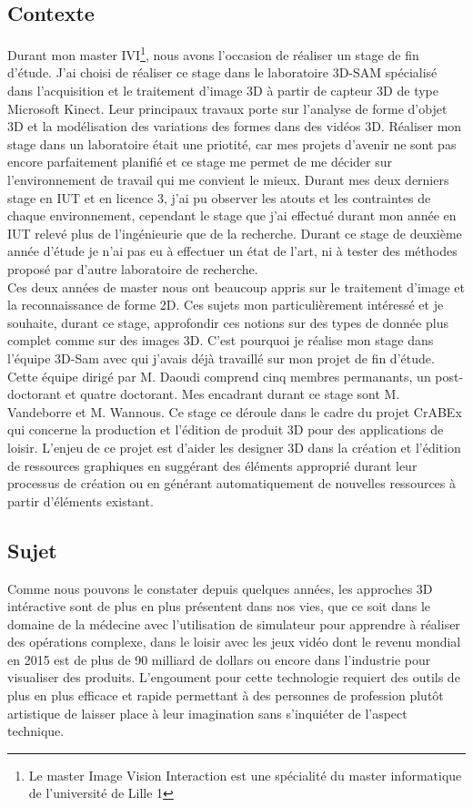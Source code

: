 \subsection{Contexte}
Durant mon master IVI\footnote{Le master Image Vision Interaction est 
une spécialité du master informatique de l'université de Lille 1}, 
nous avons l'occasion de réaliser un stage de fin d'étude. J'ai choisi de réaliser ce stage
dans le laboratoire 3D-SAM spécialisé dans l'acquisition et le traitement d'image 3D 
à partir de capteur 3D de type Microsoft Kinect. Leur principaux travaux porte sur
l'analyse de forme d'objet 3D et la modélisation des variations des formes dans des
vidéos 3D. Réaliser mon stage dans un laboratoire était une priotité, car mes projets d'avenir
ne sont pas encore parfaitement planifié et ce stage me permet de me décider sur l'environnement
de travail qui me convient le mieux. Durant mes deux derniers stage en IUT et en licence 3, j'ai pu
observer les atouts et les contraintes de chaque environnement, cependant le stage que j'ai effectué 
durant mon année en IUT relevé plus de l'ingénieurie que de la recherche. Durant ce stage de deuxième
année d'étude je n'ai pas eu à effectuer un état de l'art, ni à tester des méthodes proposé par 
d'autre laboratoire de recherche.\\

Ces deux années de master nous ont beaucoup appris sur le traitement d'image et la reconnaissance de 
forme 2D. Ces sujets mon particulièrement intéressé et je souhaite, durant ce stage, approfondir ces
notions sur des types de donnée plus complet comme sur des images 3D. C'est pourquoi je réalise mon
stage dans l'équipe 3D-Sam avec qui j'avais déjà travaillé sur mon projet de fin d'étude. Cette équipe
dirigé par M. Daoudi comprend cinq membres permanants, un post-doctorant et quatre doctorant. Mes 
encadrant durant ce stage sont M. Vandeborre et M. Wannous. Ce stage ce déroule dans le cadre du
projet CrABEx qui concerne la production et l'édition de produit 3D pour des applications de
loisir. L'enjeu de ce projet est d'aider les designer 3D dans la création et l'édition de ressources
graphiques en suggérant des éléments approprié durant leur processus de création ou en générant automatiquement 
de nouvelles ressources à partir d'éléments existant.

\subsection{Sujet}
Comme nous pouvons le constater depuis quelques années, les approches 3D intéractive sont de plus en plus 
présentent dans nos vies, que ce soit dans le domaine de la médecine avec l'utilisation de simulateur
pour apprendre à réaliser des opérations complexe, dans le loisir avec les jeux vidéo dont le revenu
mondial en 2015 est de plus de 90 milliard de dollars ou encore dans l'industrie pour visualiser des produits.
L'engoument pour cette technologie requiert des outils de plus en plus efficace et rapide permettant à
des personnes de profession plutôt artistique de laisser place à leur imagination sans s'inquiéter de 
l'aspect technique.\\

